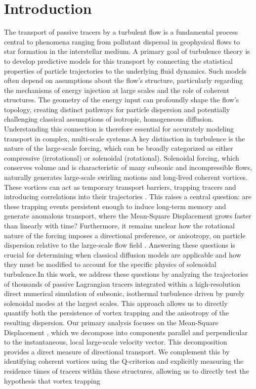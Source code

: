 \documentclass[]{article}
\begin{document}
\section{Introduction}
\label{sec:intro}
The transport of passive tracers by a turbulent flow is a fundamental process central to phenomena ranging from pollutant dispersal in geophysical flows to star formation in the interstellar medium. A primary goal of turbulence theory is to develop predictive models for this transport by connecting the statistical properties of particle trajectories to the underlying fluid dynamics. Such models often depend on assumptions about the flow's structure, particularly regarding the mechanisms of energy injection at large scales and the role of coherent structures. The geometry of the energy input can profoundly shape the flow's topology, creating distinct pathways for particle dispersion and potentially challenging classical assumptions of isotropic, homogeneous diffusion. Understanding this connection is therefore essential for accurately modeling transport in complex, multi-scale systems.A key distinction in turbulence is the nature of the large-scale forcing, which can be broadly categorized as either compressive (irrotational) or solenoidal (rotational). Solenoidal forcing, which conserves volume and is characteristic of many subsonic and incompressible flows, naturally generates large-scale swirling motions and long-lived coherent vortices. These vortices can act as temporary transport barriers, trapping tracers and introducing correlations into their trajectories  \citep{freitas2026intermittencysuppressionturbulenceforced}. This raises a central question: are these trapping events persistent enough to induce long-term memory and generate anomalous transport, where the Mean-Square Displacement grows faster than linearly with time? Furthermore, it remains unclear how the rotational nature of the forcing imposes a directional preference, or anisotropy, on particle dispersion relative to the large-scale flow field  \citep{mizerski2022anisotropicturbulentviscositylargescale}. Answering these questions is crucial for determining when classical diffusion models are applicable and how they must be modified to account for the specific physics of solenoidal turbulence.In this work, we address these questions by analyzing the trajectories of thousands of passive Lagrangian tracers  \citep{komorowski2005stationaritylagrangianobservationspassive} integrated within a high-resolution direct numerical simulation of subsonic, isothermal turbulence driven by purely solenoidal modes at the largest scales. This approach allows us to directly quantify both the persistence of vortex trapping and the anisotropy of the resulting dispersion. Our primary analysis focuses on the Mean-Square Displacement  \citep{küchler2024lagrangianparticletrackinglarge}, which we decompose into components parallel and perpendicular to the instantaneous, local large-scale velocity vector. This decomposition provides a direct measure of directional transport. We complement this by identifying coherent vortices using the Q-criterion and explicitly measuring the residence times of tracers within these structures, allowing us to directly test the hypothesis that vortex trapping 
\end{document}
